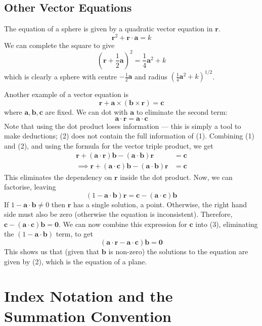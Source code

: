 \documentclass{article}
\begin{document}
\subsection{Other Vector Equations}
The equation of a sphere is given by a quadratic vector equation in $\bm r$.
\[ \bm r^2 + \bm r \cdot \bm a = k \]
We can complete the square to give
\[ \left(\bm r + \frac 1 2 \bm a \right)^2 = \frac 1 4 \bm a^2 + k \]
which is clearly a sphere with centre $-\frac 1 2 \bm a$ and radius $\left( \frac 1 4 \bm a^2 + k \right)^{1/2}$.

Another example of a vector equation is
\[ \bm r + \bm a \times (\bm b \times \bm r) = \bm c \tag{1} \]
where $\bm a, \bm b, \bm c$ are fixed. We can dot with $\bm a$ to eliminate the second term:
\[ \bm a \cdot \bm r = \bm a \cdot \bm c \tag{2} \]
Note that using the dot product loses information --- this is simply a tool to make deductions; (2) does not contain the full information of (1). Combining (1) and (2), and using the formula for the vector triple product, we get
\begin{align*}
	\bm r + (\bm a \cdot \bm r) \bm b - (\bm a \cdot \bm b) \bm r          & = \bm c \tag{3} \\
	\implies \bm r + (\bm a \cdot \bm c) \bm b - (\bm a \cdot \bm b) \bm r & = \bm c
\end{align*}
This eliminates the dependency on $\bm r$ inside the dot product. Now, we can factorise, leaving
\[ (1 - \bm a \cdot \bm b) \bm r = \bm c - (\bm a \cdot \bm c) \bm b \tag{4} \]
If $1 - \bm a \cdot \bm b \neq 0$ then $\bm r$ has a single solution, a point. Otherwise, the right hand side must also be zero (otherwise the equation is inconsistent). Therefore, $\bm c - (\bm a \cdot \bm c)\bm b = \bm 0$. We can now combine this expression for $\bm c$ into (3), eliminating the $(1- \bm a \cdot \bm b)$ term, to get
\[ (\bm a \cdot \bm r - \bm a \cdot \bm c) \bm b = \bm 0 \]
This shows us that (given that $\bm b$ is non-zero) the solutions to the equation are given by (2), which is the equation of a plane.

\section{Index Notation and the Summation Convention}
\end{document}

